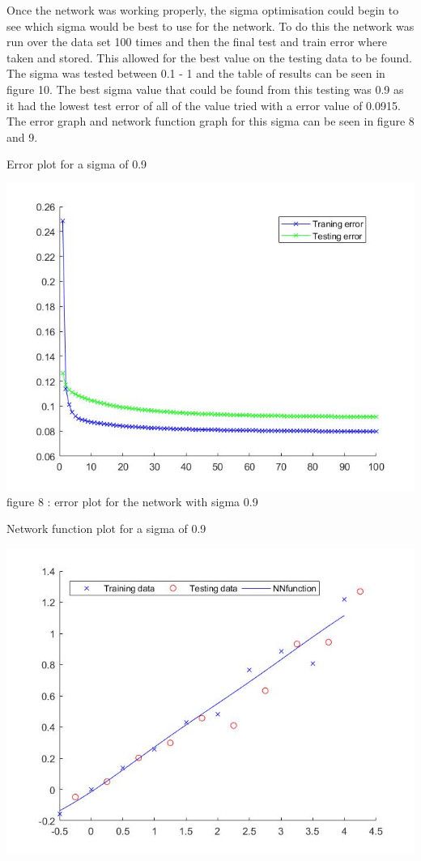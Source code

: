\documentclass{IEEEtran}
\begin{document}
\begin{flushleft}
  Once the network was working properly, the sigma optimisation could begin to see which sigma would be best to use for the
  network. To do this the network was run over the data set 100 times and then the final test and train error where taken and
  stored. This allowed for the best value on the testing data to be found. The sigma was tested between 0.1 - 1 and the table
  of results can be seen in figure 10. The best sigma value that could be found from this testing was 0.9 as it had the lowest
  test error of all of the value tried with a error value of 0.0915. The error graph and network function graph for this sigma
  can be seen in figure 8 and 9.
  \\
\vspace{1.5mm}
\begin{center}
  Error plot for a sigma of 0.9
\end{center}
\vspace{1.5mm}
\includegraphics[scale = 0.35]{Errorplottask1.jpg}
\vspace{1.5mm}
{\footnotesize figure 8 : error plot for the network with sigma 0.9 }
\\
\vspace{1.5mm}
\begin{center}
  Network function plot for a sigma of 0.9
\end{center}
\includegraphics[scale = 0.35]{NNfunctiontask1.jpg}

\end{flushleft}
\end{document}
